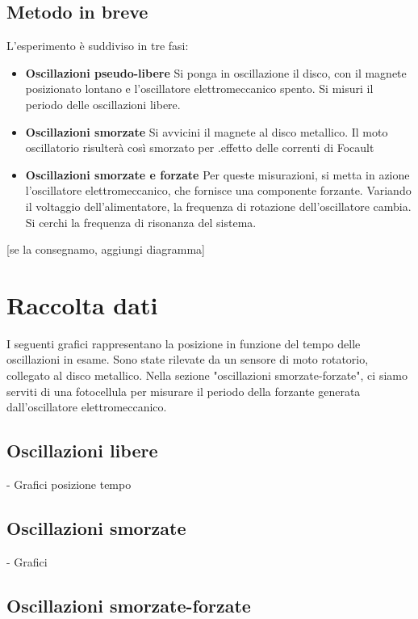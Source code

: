 \documentclass[a4paper,10pt]{report}
\begin{document}
\subsection{Metodo in breve}
L'esperimento è suddiviso in tre fasi:

\begin{itemize}
\item \textbf{Oscillazioni pseudo-libere}
Si ponga in oscillazione il disco, con il magnete  posizionato lontano e l'oscillatore elettromeccanico spento. Si misuri il periodo delle oscillazioni libere.
\item \textbf{Oscillazioni smorzate}
Si avvicini il magnete al disco metallico. Il moto oscillatorio risulterà così smorzato per .effetto delle correnti di Focault 
\item \textbf{Oscillazioni smorzate e forzate}
Per queste misurazioni, si metta in azione l'oscillatore elettromeccanico, che fornisce una componente forzante. Variando il voltaggio dell'alimentatore,  la frequenza di rotazione dell'oscillatore cambia. Si cerchi la frequenza di risonanza del sistema.
\end{itemize}

[se la consegnamo, aggiungi diagramma]

\section{Raccolta dati}

I seguenti grafici rappresentano la posizione in funzione del tempo delle oscillazioni in esame. Sono state rilevate da un sensore di moto rotatorio, collegato al disco metallico. 
Nella sezione "oscillazioni smorzate-forzate", ci siamo serviti di una fotocellula per misurare il periodo della forzante generata dall'oscillatore elettromeccanico. 

\subsection{Oscillazioni libere}

- Grafici posizione tempo 

\subsection{Oscillazioni smorzate}

- Grafici 
\subsection{Oscillazioni smorzate-forzate}
\end{document}
